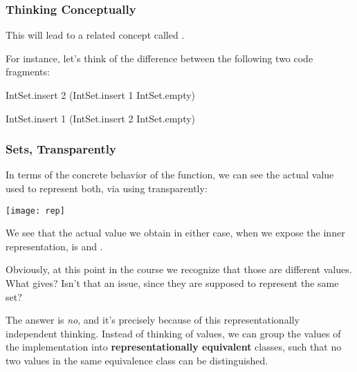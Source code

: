 \documentclass[aspectratio=169, handout]{beamer}
\begin{document}
\begin{frame}[fragile]
  \frametitle{Thinking Conceptually}

  This will lead to a related concept called .

  \pause
  \vspace{\fill}


  \pause
  \vspace{\fill}

  For instance, let's think of the difference between the following two
  code fragments:

  \begin{codeblock}
    IntSet.insert 2 (IntSet.insert 1 IntSet.empty)
  \end{codeblock}

  \begin{codeblock}
    IntSet.insert 1 (IntSet.insert 2 IntSet.empty)
  \end{codeblock}
\end{frame}

\begin{frame}[fragile]
  \frametitle{Sets, Transparently}

  In terms of the concrete behavior of the function, we can see the actual
  value used to represent both, via using  transparently:

  \begin{center}
    \texttt{[image: rep]}
  \end{center}

  We see that the actual value we obtain in either case, when we expose the
  inner representation, is \code{[1, 2]} and \code{[2, 1]}.

  \pause
  \vspace{\fill}

  Obviously, at this point in the course we recognize that those are different
  values. What gives? Isn't that an issue, since they are supposed to represent
  the same set?

  \pause
  \vspace{\fill}

  The answer is \textit{no}, and it's precisely because of this representationally
  independent thinking. Instead of thinking of values, we can group the values of
  the implementation into \textbf{representationally equivalent} classes, such that
  no two values in the same equivalence class can be distinguished.
\end{frame}
\end{document}
